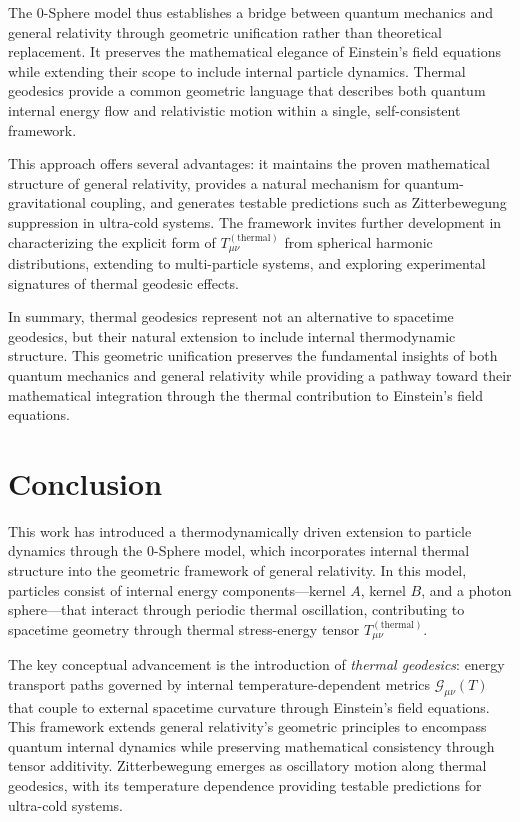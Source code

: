 \documentclass[%
 reprint,
 amsmath,amssymb,
 aps,
]{revtex4-1}
\numberwithin{equation}{section}%
\begin{document}
The 0-Sphere model thus establishes a bridge between quantum mechanics and general relativity through geometric unification rather than theoretical replacement. It preserves the mathematical elegance of Einstein's field equations while extending their scope to include internal particle dynamics. Thermal geodesics provide a common geometric language that describes both quantum internal energy flow and relativistic motion within a single, self-consistent framework.

This approach offers several advantages: it maintains the proven mathematical structure of general relativity, provides a natural mechanism for quantum-gravitational coupling, and generates testable predictions such as Zitterbewegung suppression in ultra-cold systems. The framework invites further development in characterizing the explicit form of $T_{\mu\nu}^{(\text{thermal})}$ from spherical harmonic distributions, extending to multi-particle systems, and exploring experimental signatures of thermal geodesic effects.

In summary, thermal geodesics represent not an alternative to spacetime geodesics, but their natural extension to include internal thermodynamic structure. This geometric unification preserves the fundamental insights of both quantum mechanics and general relativity while providing a pathway toward their mathematical integration through the thermal contribution to Einstein's field equations.


\section{Conclusion}

This work has introduced a thermodynamically driven extension to particle dynamics through the 0-Sphere model, which incorporates internal thermal structure into the geometric framework of general relativity. In this model, particles consist of internal energy components—kernel $A$, kernel $B$, and a photon sphere—that interact through periodic thermal oscillation, contributing to spacetime geometry through thermal stress-energy tensor $T_{\mu\nu}^{(\text{thermal})}$.

The key conceptual advancement is the introduction of \textit{thermal geodesics}: energy transport paths governed by internal temperature-dependent metrics $\mathcal{G}_{\mu\nu}(T)$ that couple to external spacetime curvature through Einstein's field equations. This framework extends general relativity's geometric principles to encompass quantum internal dynamics while preserving mathematical consistency through tensor additivity. Zitterbewegung emerges as oscillatory motion along thermal geodesics, with its temperature dependence providing testable predictions for ultra-cold systems.
\end{document}
